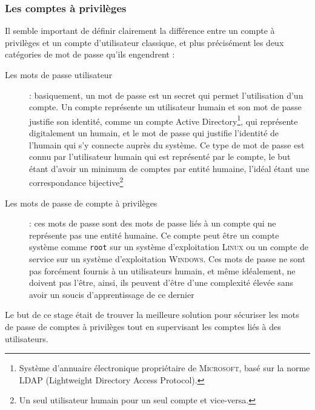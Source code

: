 \subsubsection{Les comptes à privilèges}
Il semble important de définir clairement la différence entre un compte à privilèges et un compte d'utilisateur classique, et plus précisément les deux catégories de mot de passe qu'ils engendrent :
\begin{description}
	\item [Les mots de passe utilisateur] : basiquement, un mot de passe est un secret qui permet l'utilisation d'un compte. Un compte représente un utilisateur humain et son mot de passe justifie son identité, comme un compte Active Directory\footnote{Système d'annuaire électronique propriétaire de \textsc{Microsoft}, basé sur la norme LDAP (Lightweight Directory Access Protocol).}, qui représente digitalement un humain, et le mot de passe qui justifie l'identité de l'humain qui s'y connecte auprès du système. Ce type de mot de passe est connu par l'utilisateur humain qui est représenté par le compte, le but étant d'avoir un minimum de comptes par entité humaine, l'idéal étant une correspondance bijective\footnote{Un seul utilisateur humain pour un seul compte et vice-versa.}
	\item [Les mots de passe de compte à privilèges] : ces mots de passe sont des mots de passe liés à un compte qui ne représente pas une entité humaine. Ce compte peut être un compte système comme \texttt{root} sur un système d'exploitation \textsc{Linux} ou un compte de service sur un système d'exploitation \textsc{Windows}. Ces mots de passe ne sont pas forcément fournis à un utilisateurs humain, et même idéalement, ne doivent pas l'être, ainsi, ils peuvent d'être d'une complexité élevée sans avoir un soucis d'apprentissage de ce dernier
\end{description}

Le but de ce stage était de trouver la meilleure solution pour sécuriser les mots de passe de comptes à privilèges tout en supervisant les comptes liés à des utilisateurs.


